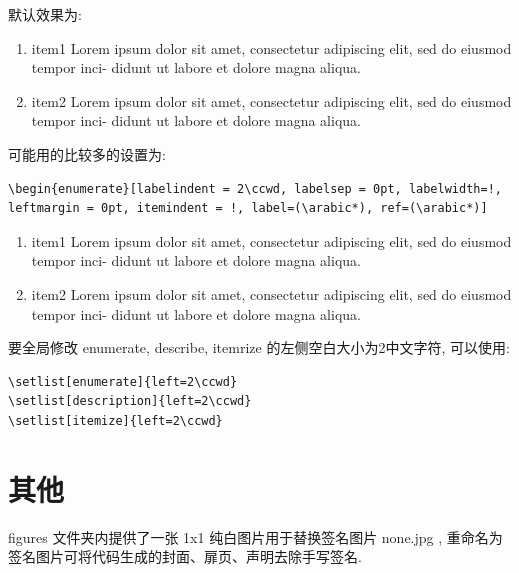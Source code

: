 默认效果为:
\begin{enumerate}
    \item item1 Lorem ipsum dolor sit amet, consectetur adipiscing elit, sed do eiusmod tempor inci-
          didunt ut labore et dolore magna aliqua.
    \item item2 Lorem ipsum dolor sit amet, consectetur adipiscing elit, sed do eiusmod tempor inci-
          didunt ut labore et dolore magna aliqua.
\end{enumerate}

可能用的比较多的设置为:
\begin{lstlisting}
\begin{enumerate}[labelindent = 2\ccwd, labelsep = 0pt, labelwidth=!, leftmargin = 0pt, itemindent = !, label=(\arabic*), ref=(\arabic*)]
\end{lstlisting}
\begin{enumerate}[labelindent = 2\ccwd, labelsep = 0pt, labelwidth=!, leftmargin = 0pt, itemindent = !, label=(\arabic*), ref=(\arabic*)]
    \item item1 Lorem ipsum dolor sit amet, consectetur adipiscing elit, sed do eiusmod tempor inci-
          didunt ut labore et dolore magna aliqua.
    \item item2 Lorem ipsum dolor sit amet, consectetur adipiscing elit, sed do eiusmod tempor inci-
          didunt ut labore et dolore magna aliqua.
\end{enumerate}

要全局修改 enumerate, describe, itemrize 的左侧空白大小为2中文字符, 可以使用:
\begin{lstlisting}
\setlist[enumerate]{left=2\ccwd}
\setlist[description]{left=2\ccwd}
\setlist[itemize]{left=2\ccwd}
\end{lstlisting}


\section{其他}
figures 文件夹内提供了一张 1x1 纯白图片用于替换签名图片 none.jpg , 重命名为签名图片可将代码生成的封面、扉页、声明去除手写签名.


